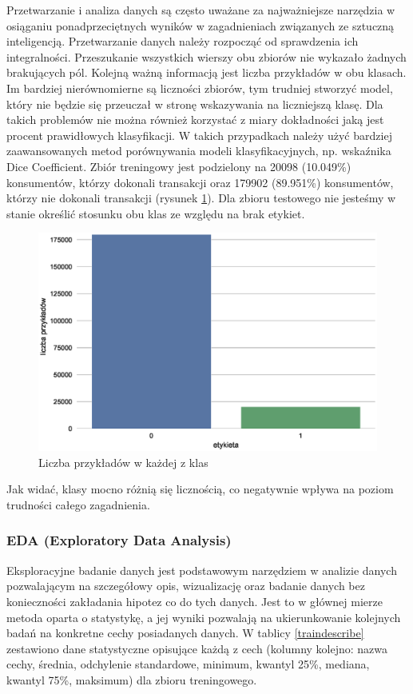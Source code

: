 ﻿\documentclass[12pt]{article}
\begin{document}
Przetwarzanie i analiza danych są często uważane za najważniejsze narzędzia w osiąganiu ponadprzeciętnych wyników w zagadnieniach związanych ze sztuczną inteligencją. Przetwarzanie danych należy rozpocząć od sprawdzenia ich integralności. Przeszukanie wszystkich wierszy obu zbiorów nie wykazało żadnych brakujących pól. Kolejną ważną informacją jest liczba przykładów w obu klasach. Im bardziej nierównomierne są liczności zbiorów, tym trudniej stworzyć model, który nie będzie się przeuczał w stronę wskazywania na liczniejszą klasę. Dla takich problemów nie można również korzystać z miary dokładności jaką jest procent prawidłowych klasyfikacji. W takich przypadkach należy użyć bardziej zaawansowanych metod porównywania modeli klasyfikacyjnych, np. wskaźnika Dice Coefficient. Zbiór treningowy jest podzielony na 20098 (10.049\%) konsumentów, którzy dokonali transakcji oraz 179902 (89.951\%) konsumentów, którzy nie dokonali transakcji (rysunek \ref{classescount}). Dla zbioru testowego nie jesteśmy w stanie określić stosunku obu klas ze względu na brak etykiet. 
\begin{figure}[H]
\centering \includegraphics[scale=0.7]{classes.eps}
\caption{Liczba przykładów w każdej z klas}
\label{classescount}
\end{figure}
Jak widać, klasy mocno różnią się licznością, co negatywnie wpływa na poziom trudności całego zagadnienia.

\subsubsection{EDA (Exploratory Data Analysis)}

Eksploracyjne badanie danych jest podstawowym narzędziem w analizie danych pozwalającym na szczegółowy opis, wizualizację oraz badanie danych bez konieczności zakładania hipotez co do tych danych. Jest to w głównej mierze metoda oparta o statystykę, a jej wyniki pozwalają na ukierunkowanie kolejnych badań na konkretne cechy posiadanych danych. 
\newline W tablicy \ref{traindescribe} zestawiono dane statystyczne opisujące każdą z cech (kolumny kolejno: nazwa cechy, średnia, odchylenie standardowe, minimum, kwantyl 25\%, mediana, kwantyl 75\%, maksimum) dla zbioru treningowego.
\end{document}
